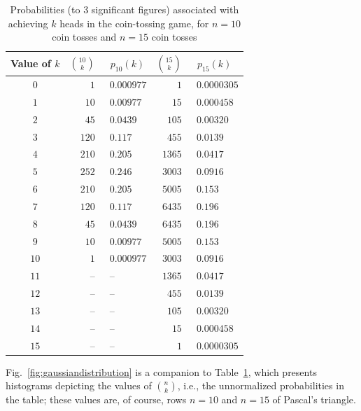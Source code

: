 \begin{table}[htb]
\caption{Probabilities (to $3$ significant figures) associated with achieving $k$ {\sc head}s in the coin-tossing game, for $n = 10$ coin tosses and $n= 15$ coin tosses}
\begin{center}
\label{tab:select-replace}
\begin{tabular}{|c||r|l||r|l|}
\hline
Value of $k$ & $\displaystyle {10 \choose k}$ & \ $p_{10}(k)$ 
& $\displaystyle {15 \choose k}$ & \ $p_{15}(k)$ \\
\hline
\hline
$0$   &   $  1$ & \ $0.000977$ &     $   1$ &  \ $0.0000305$ \\
$1$   &   $10$ & \   $0.00977$ &      $15$ &  \   $0.000458$ \\
$2$   &   $45$ & \     $0.0439$ &    $105$ &  \     $0.00320$ \\
$3$   & $120$ & \       $0.117$ &    $455$ &  \       $0.0139$ \\
$4$   & $210$ & \      $0.205$ &   $1365$ &  \       $0.0417$ \\
$5$   & $252$ & \      $0.246$ &   $3003$ &  \       $0.0916$ \\
$6$   & $210$ & \      $0.205$ &   $5005$ &  \         $0.153$ \\
$7$   & $120$ & \      $0.117$ &   $6435$ &  \         $0.196$ \\
$8$   &   $45$ & \    $0.0439$ &   $6435$ &  \         $0.196$ \\
$9$   &   $10$ & \  $0.00977$ &   $5005$ & \          $0.153$ \\
$10$ &     $1$ & \ $0.000977$ &  $3003$ & \        $0.0916$ \\
$11$ & --        & \ --                  &   $1365$ & \        $0.0417$ \\
$12$ & --        & \ --                 &      $455$ & \        $0.0139$ \\
$13$ & --       & \ --                  &      $105$ & \      $0.00320$ \\
$14$ & --       & \ --                  &        $15$ & \    $0.000458$ \\
$15$ & --       & \ --                  &          $1$ & \  $0.0000305$  \\
\hline
\end{tabular}
\end{center}
\end{table}
Fig.~\ref{fig:gaussiandistribution} is a companion to Table~\ref{tab:select-replace}, which presents histograms depicting the values of $\displaystyle {n \choose k}$, i.e., the unnormalized probabilities in the table; these values are, of course, rows $n =10$ and $n=15$ of Pascal's triangle.
